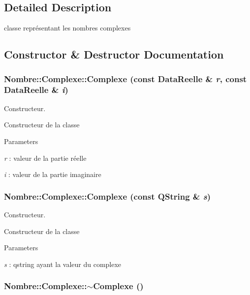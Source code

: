 \subsection{Detailed Description}
classe représentant les nombres complexes 

\subsection{Constructor \& Destructor Documentation}
\hypertarget{classNombre_1_1Complexe_a752a5842b99a8e39bb89f4276d43e83c}{
\subsubsection[{Complexe}]{\setlength{\rightskip}{0pt plus 5cm}Nombre::Complexe::Complexe (const {\bf DataReelle} \& {\em r}, \/  const {\bf DataReelle} \& {\em i})}}
\label{classNombre_1_1Complexe_a752a5842b99a8e39bb89f4276d43e83c}


Constructeur. 

Constructeur de la classe


\begin{DoxyParams}{Parameters}
\item[{\em r}]: valeur de la partie réelle \item[{\em i}]: valeur de la partie imaginaire \end{DoxyParams}
\hypertarget{classNombre_1_1Complexe_ac99372bf8b18c413b5c291b74eb846a4}{
\subsubsection[{Complexe}]{\setlength{\rightskip}{0pt plus 5cm}Nombre::Complexe::Complexe (const QString \& {\em s})}}
\label{classNombre_1_1Complexe_ac99372bf8b18c413b5c291b74eb846a4}


Constructeur. 

Constructeur de la classe


\begin{DoxyParams}{Parameters}
\item[{\em s}]: qstring ayant la valeur du complexe \end{DoxyParams}
\hypertarget{classNombre_1_1Complexe_abb864b5ffce7a6cc57c34ca06f331a60}{
\subsubsection[{$\sim$Complexe}]{\setlength{\rightskip}{0pt plus 5cm}Nombre::Complexe::$\sim$Complexe ()}}
\label{classNombre_1_1Complexe_abb864b5ffce7a6cc57c34ca06f331a60}


